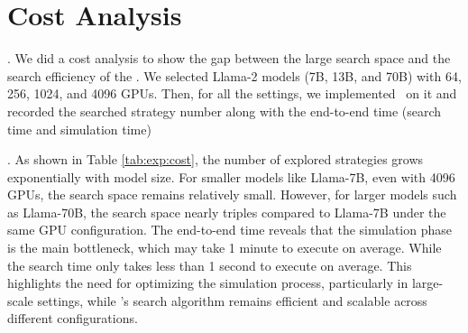 



\section{Cost Analysis}\label{sec:exp:cost}

.
We did a cost analysis to show the gap between the large search space and the search efficiency of the \sysname.
We selected Llama-2 models (7B, 13B, and 70B) with 64, 256, 1024, and 4096 GPUs.
Then, for all the settings, we implemented \sysname\ on it and recorded the searched strategy number along with the end-to-end time (search time and simulation time)


. As shown in Table \ref{tab:exp:cost}, the number of explored strategies grows exponentially with model size. For smaller models like Llama-7B, even with 4096 GPUs, the search space remains relatively small. However, for larger models such as Llama-70B, the search space nearly triples compared to Llama-7B under the same GPU configuration. The end-to-end time reveals that the simulation phase is the main bottleneck, which may take 1 minute to execute on average. While the search time only takes less than 1 second to execute on average. This highlights the need for optimizing the simulation process, particularly in large-scale settings, while \sysname’s search algorithm remains efficient and scalable across different configurations.


